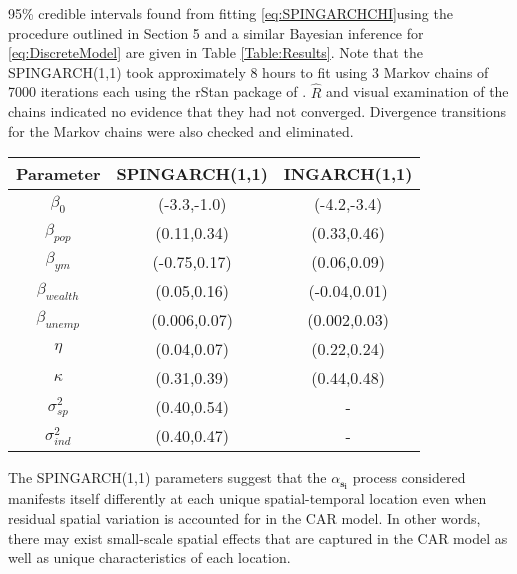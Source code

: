 \documentclass[11pt]{isuthesis}
\begin{document}
95\% credible intervals found from fitting \eqref{eq:SPINGARCHCHI}using the procedure outlined in Section 5 and a similar Bayesian inference for \eqref{eq:DiscreteModel} are given in Table \ref{Table:Results}.  Note that the SPINGARCH(1,1) took approximately 8 hours to fit using 3 Markov chains of 7000 iterations each using the rStan package of \cite{carpenter2016stan}.  $\hat{R}$ and visual examination of the chains indicated no evidence that they had not converged.  Divergence transitions for the Markov chains were also checked and eliminated.


\begin{table}[!htp]
	\begin{center}
		\begin{tabular}{ |c|c|c| } 
			\hline
			Parameter & SPINGARCH(1,1) & INGARCH(1,1) \\
			\hline 
			$\beta_0$ & (-3.3,-1.0) & (-4.2,-3.4) \\
			$\beta_{pop}$ & (0.11,0.34) & (0.33,0.46)\\
			$\beta_{ym}$ & (-0.75,0.17)& (0.06,0.09)\\
			$\beta_{wealth}$&(0.05,0.16) & (-0.04,0.01)\\
			$\beta_{unemp}$ & (0.006,0.07)& (0.002,0.03) \\
			$\eta$ & (0.04,0.07) & (0.22,0.24)\\
			$\kappa$ & (0.31,0.39)& (0.44,0.48)\\
			$\sigma_{sp}^2$ & (0.40,0.54) & - \\
			$\sigma_{ind}^2$& (0.40,0.47)& - \\
			\hline
		\end{tabular}
	\end{center}
	\label{Table:ResultsChi}
\end{table}

The SPINGARCH(1,1) parameters suggest that the $\alpha_{\boldsymbol{s_i}}$ process considered manifests itself differently at each unique spatial-temporal location even when residual spatial variation is accounted for in the CAR model.  In other words, there may exist small-scale spatial effects that are captured in the CAR model as well as unique characteristics of each location.
\end{document}
